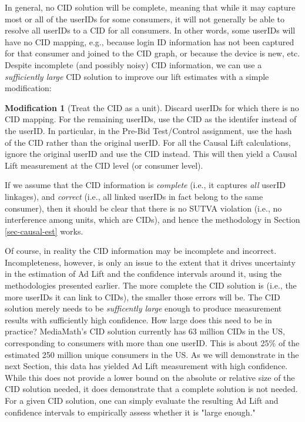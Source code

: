 \documentclass[11pt,a4paper]{article}
\theoremstyle{definition}
\theoremstyle{remark}
\theoremstyle{definition}
\theoremstyle{definition}
\theoremstyle{definition}
\theoremstyle{definition}
\theoremstyle{definition}
\newtheorem{modification}{Modification}[section]
\theoremstyle{definition}
\begin{document}
In general, no CID solution will be complete, meaning that while it may capture most or all of the userIDs for some consumers, it will not generally be able to resolve all userIDs to a CID for all consumers. In other words, some userIDs will have no CID mapping, e.g., because login ID information has not been captured for that consumer and joined to the CID graph, or because the device is new, etc. Despite incomplete (and possibly noisy) CID information, we can use a {\em sufficiently large} CID solution to improve our lift estimates with a simple modification: 

\begin{modification}[Treat the CID as a unit]
Discard userIDs for which there is no CID mapping. For the remaining userIDs, use the CID as the identifer instead of the userID. In particular, in the Pre-Bid Test/Control assignment, use the hash of the CID rather than the original userID. For all the Causal Lift calculations, ignore the original userID and use the CID instead. This will then yield a Causal Lift measurement at the CID level (or consumer level).
\end{modification}

If we assume that the CID information is \textit{complete} (i.e., it captures \textit{all} userID linkages), and \textit{correct} (i.e., all linked userIDs in fact belong to the same consumer), then it should be clear that there is no SUTVA violation (i.e., no interference among units, which are CIDs), and hence the methodology in Section \ref{sec-causal-est} works. 

Of course, in reality the CID information may be incomplete and incorrect. Incompleteness, however, is only an issue to the extent that it drives uncertainty in the estimation of Ad Lift and the confidence intervals around it, using the methodologies presented earlier. The more complete the CID solution is (i.e., the more userIDs it can link to CIDs), the smaller those errors will be. The CID solution merely needs to be {\em sufficently large} enough to produce measurement results with sufficiently high confidence. How large does this need to be in practice? MediaMath's CID solution currently has 63 million CIDs in the US, corresponding to consumers with more than one userID. This is about 25\% of the estimated 250 million unique consumers in the US. As we will demonstrate in the next Section, this data has yielded Ad Lift measurement with high confidence. While this does not provide a lower bound on the absolute or relative size of the CID solution needed, it does demonstrate that a complete solution is not needed. For a given CID solution, one can simply evaluate the resulting Ad Lift and confidence intervals to empirically assess whether it is "large enough."
\end{document}
